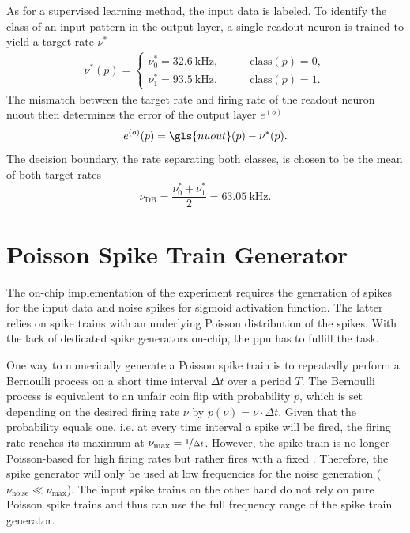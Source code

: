 As for a supervised learning method, the input data is labeled. To identify the class of an input pattern in the output layer, a single readout neuron is trained to yield a target rate $\nu^*$
\begin{align}
\nu^*(p) =
\begin{cases}
\nu_0^* = \SI{32.6}{\kilo \Hz} ,&\quad \quad \text{class}(p) = 0,\\
\nu_1^* = \SI{93.5}{\kilo \Hz} ,&\quad \quad \text{class}(p) = 1.
\end{cases}
\label{circlestarget}
\end{align}
The mismatch between the target rate and firing rate of the readout neuron \gls{nuout} then determines the error of the output layer $e^{(o)}$
\begin{equation*}
e^{(o)}(p) = \gls{nuout}(p) - \nu^*(p).
\label{circleserror}
\end{equation*}
The decision boundary, the rate separating both classes, is chosen to be the mean of both target rates
\begin{equation*}
\nu_\text{DB} = \frac{\nu_0^* + \nu_1^*}{2} = \SI{63.05}{\kilo \Hz}.
\label{circlesdb}
\end{equation*}


\section{Poisson Spike Train Generator}
\label{poissonspiketrains}
The on-chip implementation of the experiment requires the generation of spikes for the input data and noise spikes for sigmoid activation function. The latter relies on spike trains with an underlying Poisson distribution of the spikes. With the lack of dedicated spike generators on-chip, the \gls{ppu} has to fulfill the task.

One way to numerically generate a Poisson spike train is to repeatedly perform a Bernoulli process on a short time interval $\Delta t$ over a period $T$. The Bernoulli process is equivalent to an unfair coin flip with probability $p$, which is set depending on the desired firing rate $\nu$ by $p(\nu) = \nu \cdot \Delta t$. Given that the probability equals one, i.e. at every time interval a spike will be fired, the firing rate reaches its maximum at $\nu_\text{max} = \nicefrac{1}{\Delta t}$. However, the spike train is no longer Poisson-based for high firing rates but rather fires with a fixed . Therefore, the spike generator will only be used at low frequencies for the noise generation ($\nu_\text{noise} \ll \nu_\text{max}$). The input spike trains on the other hand do not rely on pure Poisson spike trains and thus can use the full frequency range of the spike train generator.

